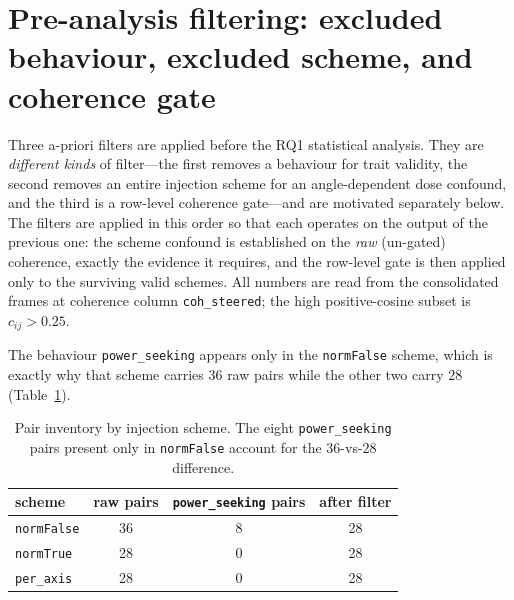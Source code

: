 
\section{Pre-analysis filtering: excluded behaviour, excluded scheme, and
coherence gate}
\label{app:naive}

Three a-priori filters are applied before the RQ1 statistical analysis. They are
\emph{different kinds} of filter---the first removes a behaviour for trait
validity, the second removes an entire injection scheme for an angle-dependent
dose confound, and the third is a row-level coherence gate---and are motivated
separately below. The filters are applied in this order so that each operates on
the output of the previous one: the scheme confound is established on the
\emph{raw} (un-gated) coherence, exactly the evidence it requires, and the
row-level gate is then applied only to the surviving valid schemes. All numbers
are read from the consolidated frames at coherence column \texttt{coh\_steered};
the high positive-cosine subset is $c_{ij}>0.25$.

The behaviour \texttt{power\_seeking} appears only in the \texttt{normFalse}
scheme, which is exactly why that scheme carries $36$ raw pairs while the other
two carry $28$ (Table~\ref{tab:pair-inventory}).

\begin{table}[h]
  \centering
  \small
  \begin{tabular}{lccc}
    \toprule
    scheme & raw pairs & \texttt{power\_seeking} pairs & after filter \\
    \midrule
    \texttt{normFalse} & 36 & 8 & 28 \\
    \texttt{normTrue}  & 28 & 0 & 28 \\
    \texttt{per\_axis} & 28 & 0 & 28 \\
    \bottomrule
  \end{tabular}
  \caption{Pair inventory by injection scheme. The eight \texttt{power\_seeking}
  pairs present only in \texttt{normFalse} account for the $36$-vs-$28$
  difference.}
  \label{tab:pair-inventory}
\end{table}


